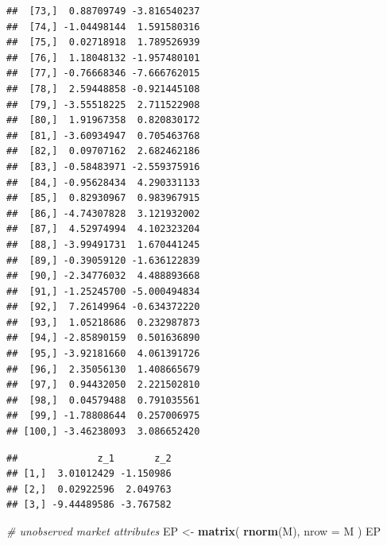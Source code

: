 \documentclass[]{book}
\newenvironment{Shaded}{\begin{snugshade}}{\end{snugshade}}
\newcommand{\KeywordTok}[1]{\textcolor[rgb]{0.13,0.29,0.53}{\textbf{#1}}}
\newcommand{\DataTypeTok}[1]{\textcolor[rgb]{0.13,0.29,0.53}{#1}}
\newcommand{\DecValTok}[1]{\textcolor[rgb]{0.00,0.00,0.81}{#1}}
\newcommand{\StringTok}[1]{\textcolor[rgb]{0.31,0.60,0.02}{#1}}
\newcommand{\CommentTok}[1]{\textcolor[rgb]{0.56,0.35,0.01}{\textit{#1}}}
\newcommand{\OperatorTok}[1]{\textcolor[rgb]{0.81,0.36,0.00}{\textbf{#1}}}
\newcommand{\NormalTok}[1]{#1}
\begin{document}
\begin{verbatim}
##  [73,]  0.88709749 -3.816540237
##  [74,] -1.04498144  1.591580316
##  [75,]  0.02718918  1.789526939
##  [76,]  1.18048132 -1.957480101
##  [77,] -0.76668346 -7.666762015
##  [78,]  2.59448858 -0.921445108
##  [79,] -3.55518225  2.711522908
##  [80,]  1.91967358  0.820830172
##  [81,] -3.60934947  0.705463768
##  [82,]  0.09707162  2.682462186
##  [83,] -0.58483971 -2.559375916
##  [84,] -0.95628434  4.290331133
##  [85,]  0.82930967  0.983967915
##  [86,] -4.74307828  3.121932002
##  [87,]  4.52974994  4.102323204
##  [88,] -3.99491731  1.670441245
##  [89,] -0.39059120 -1.636122839
##  [90,] -2.34776032  4.488893668
##  [91,] -1.25245700 -5.000494834
##  [92,]  7.26149964 -0.634372220
##  [93,]  1.05218686  0.232987873
##  [94,] -2.85890159  0.501636890
##  [95,] -3.92181660  4.061391726
##  [96,]  2.35056130  1.408665679
##  [97,]  0.94432050  2.221502810
##  [98,]  0.04579488  0.791035561
##  [99,] -1.78808644  0.257006975
## [100,] -3.46238093  3.086652420
\end{verbatim}

\begin{Shaded}
\end{Shaded}

\begin{verbatim}
##              z_1       z_2
## [1,]  3.01012429 -1.150986
## [2,]  0.02922596  2.049763
## [3,] -9.44489586 -3.767582
\end{verbatim}

\begin{Shaded}
\begin{Highlighting}[]
\CommentTok{# unobserved market attributes}
\NormalTok{EP <-}\StringTok{ }\KeywordTok{matrix}\NormalTok{(}
  \KeywordTok{rnorm}\NormalTok{(M),}
  \DataTypeTok{nrow =}\NormalTok{ M}
\NormalTok{)}
\NormalTok{EP}
\end{Highlighting}
\end{Shaded}
\end{document}

